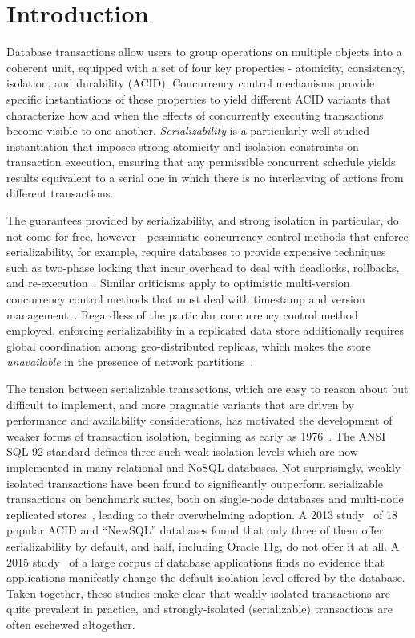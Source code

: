 
\section{Introduction}

Database transactions allow users to group operations on multiple
objects into a coherent unit, equipped with a set of four key
properties - atomicity, consistency, isolation, and durability (ACID).
Concurrency control mechanisms provide specific instantiations of
these properties to yield different ACID variants that characterize
how and when the effects of concurrently executing transactions become
visible to one another.  \emph{Serializability} is a particularly
well-studied instantiation that imposes strong atomicity and isolation
constraints on transaction execution, ensuring that any permissible
concurrent schedule yields results equivalent to a serial one in which
there is no interleaving of actions from different transactions.

The guarantees provided by serializability, and strong isolation in
particular, do not come for free, however - pessimistic concurrency
control methods that enforce serializability, for example, require
databases to provide expensive techniques such as two-phase locking
that incur overhead to deal with deadlocks, rollbacks, and
re-execution~\cite{twopl,ullmanbook}.  Similar criticisms apply to
optimistic multi-version concurrency control methods that must deal
with timestamp and version management~\cite{BG81}.  Regardless of the
particular concurrency control method employed, enforcing
serializability in a replicated data store additionally requires
global coordination among geo-distributed replicas, which makes the
store \emph{unavailable} in the presence of network
partitions~\cite{cap,sernotavlbl,bailishat,bernsigmod13}.

The tension between serializable transactions, which are easy to
reason about but difficult to implement, and more pragmatic variants
that are driven by performance and availability considerations, has
motivated the development of weaker forms of transaction isolation,
beginning as early as 1976~\cite{gray1976}. The ANSI SQL 92 standard
defines three such weak isolation levels which are now implemented in
many relational and NoSQL databases. Not surprisingly, weakly-isolated
transactions have been found to significantly outperform serializable
transactions on benchmark suites, both on single-node databases and
multi-node replicated stores~\cite{dbtuningbook,bailishat,bailisvldb},
leading to their overwhelming adoption. A 2013
study~\cite{bailishotos} of 18 popular ACID and ``NewSQL'' databases
found that only three of them offer serializability by default, and
half, including Oracle 11g, do not offer it at all.  A 2015
study~\cite{bailisferal} of a large corpus of database applications
finds no evidence that applications manifestly change the default
isolation level offered by the database. Taken together, these studies
make clear that weakly-isolated transactions are quite prevalent in
practice, and strongly-isolated (serializable) transactions are often
eschewed altogether.

